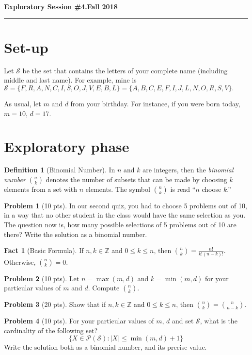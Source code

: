 \documentclass[11pt]{article}
\theoremstyle{definition}
\newtheorem*{definition*}{Definition}
\newtheorem{problem}{Problem}
\theoremstyle{theorem}
\newtheorem{fact}{Fact}
\newcommand{\separator}{%
  \nointerlineskip \vspace{.5\baselineskip}\hspace{\fill}
  {\resizebox{0.5\linewidth}{0.5ex} 
    {\pgfornament[color = black]{88}
    }}%
  \hspace{\fill}
  \par\nointerlineskip \vspace{.5\baselineskip}
}
\begin{document}
\hfill{\large\bf Exploratory Session \#4.}\hfill{\large\bf  Fall 2018}\hrule

\section*{Set-up}
Let $\mathcal{S}$ be the set that contains the letters of your complete name (including middle and last name).  For
example, mine is $\mathcal{S}=\{ F,R,A,N,C,I,S,O,J,V,E,B,L \} = \{ A,B,C,E,F,I,J,L,N,O,R,S,V \}.$

As usual, let $m$ and $d$ from your birthday.  For instance, if you were born today, $m=10$, $d=17$.

\section*{Exploratory phase}
\begin{definition*}[Binomial Number]
  In $n$ and $k$ are integers, then the \emph{binomial number} $\binom{n}{k}$ denotes the number of subsets that can be
  made by choosing $k$ elements from a set with $n$ elements. The symbol $\binom{n}{k}$ is read ``$n$ choose $k$.''
\end{definition*}
\separator

\begin{problem}[10 pts]
  In our second quiz, you had to choose 5 problems out of 10, in a way that no other student in the class would have the
  same selection as you.  The question now is, how many possible selections of 5 problems out of 10 are there?  Write
  the solution as a binomial number.
\end{problem}
\separator

\begin{fact}[Basic Formula]
  If $n,k \in \mathbb{Z}$ and $0 \leq k \leq n$, then $\binom{n}{k} = \frac{n!}{k! (n-k)!}$.  Otherwise, $\binom{n}{k}=0$.
\end{fact}
\separator

\begin{problem}[10 pts]
  Let $n=\max(m,d)$ and $k=\min(m,d)$ for your particular values of $m$ and $d$.  Compute $\binom{n}{k}$.
\end{problem} 

\begin{problem}[20 pts]
  Show that if $n,k \in \mathbb{Z}$ and $0\leq k \leq n$, then $\binom{n}{k} = \binom{n}{n-k}$.
\end{problem}

\begin{problem}[10 pts]
  For your particular values of $m$, $d$ and set $\mathcal{S}$, what is the cardinality of the following set?   
  \begin{equation*}
    \big\{ X \in \mathscr{P}(\mathcal{S}) : \lvert X \rvert \leq \min(m,d)+1 \big\}
  \end{equation*}
  Write the solution both as a binomial number, and its precise value.
\end{problem}
\separator
\end{document}
